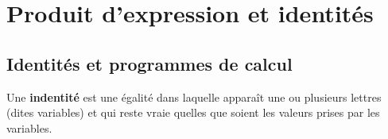 \documentclass[main.tex]{subfiles}
\begin{document}
 
\cleardoublepage 
{}  
\pagestyle{scrheadings} %
\onehalfspacing 
\setcounter{chapter}{2}
\chapter{Produit d'expression et identités}

%	 


%	 
\section{Identités  et programmes de calcul}

Une \textbf{indentité} est une égalité dans laquelle apparaît une ou plusieurs lettres (dites variables) et qui reste vraie quelles que soient les valeurs prises par les variables. 
\end{document}

